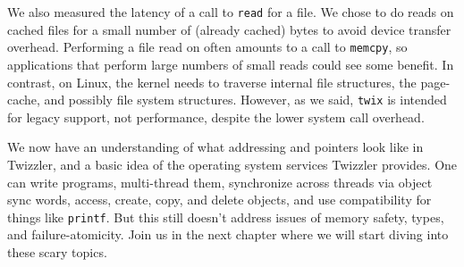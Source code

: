 We also measured the latency of a call to \texttt{read} for a file. We chose to do reads on cached
files for a small number of (already cached) bytes to avoid device transfer overhead. Performing a file read on
\Twizzler often amounts to a call to \texttt{memcpy}, so applications that perform large numbers of
small reads could see some benefit. In contrast, on Linux, the kernel needs to traverse internal
file structures, the page-cache, and possibly file system structures.
However, as we said, \texttt{twix} is intended for legacy
support, not performance, despite the lower system call overhead.

\begin{chconc}
    We now have an understanding of what addressing and pointers look like in Twizzler, and a basic idea of the
    operating system services Twizzler provides. One can write programs, multi-thread them, synchronize across
    threads via object sync words, access, create, copy, and
    delete objects, and use \unix compatibility for things like \texttt{printf}. But this still doesn't address issues
    of memory safety, types, and failure-atomicity. Join us in the next chapter where we will start diving into these
    scary topics.
\end{chconc}